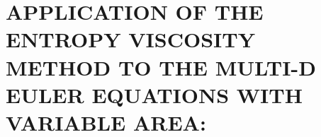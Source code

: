 %
%
%


\chapter{\uppercase {Application of the entropy viscosity method to the multi-D Euler equations with variable area:}}
